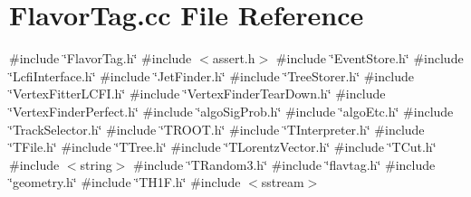 \section{Flavor\+Tag.\+cc File Reference}
\label{FlavorTag_8cc}
{\ttfamily \#include \char`\"{}Flavor\+Tag.\+h\char`\"{}}\newline
{\ttfamily \#include $<$assert.\+h$>$}\newline
{\ttfamily \#include \char`\"{}Event\+Store.\+h\char`\"{}}\newline
{\ttfamily \#include \char`\"{}Lcfi\+Interface.\+h\char`\"{}}\newline
{\ttfamily \#include \char`\"{}Jet\+Finder.\+h\char`\"{}}\newline
{\ttfamily \#include \char`\"{}Tree\+Storer.\+h\char`\"{}}\newline
{\ttfamily \#include \char`\"{}Vertex\+Fitter\+L\+C\+F\+I.\+h\char`\"{}}\newline
{\ttfamily \#include \char`\"{}Vertex\+Finder\+Tear\+Down.\+h\char`\"{}}\newline
{\ttfamily \#include \char`\"{}Vertex\+Finder\+Perfect.\+h\char`\"{}}\newline
{\ttfamily \#include \char`\"{}algo\+Sig\+Prob.\+h\char`\"{}}\newline
{\ttfamily \#include \char`\"{}algo\+Etc.\+h\char`\"{}}\newline
{\ttfamily \#include \char`\"{}Track\+Selector.\+h\char`\"{}}\newline
{\ttfamily \#include \char`\"{}T\+R\+O\+O\+T.\+h\char`\"{}}\newline
{\ttfamily \#include \char`\"{}T\+Interpreter.\+h\char`\"{}}\newline
{\ttfamily \#include \char`\"{}T\+File.\+h\char`\"{}}\newline
{\ttfamily \#include \char`\"{}T\+Tree.\+h\char`\"{}}\newline
{\ttfamily \#include \char`\"{}T\+Lorentz\+Vector.\+h\char`\"{}}\newline
{\ttfamily \#include \char`\"{}T\+Cut.\+h\char`\"{}}\newline
{\ttfamily \#include $<$string$>$}\newline
{\ttfamily \#include \char`\"{}T\+Random3.\+h\char`\"{}}\newline
{\ttfamily \#include \char`\"{}flavtag.\+h\char`\"{}}\newline
{\ttfamily \#include \char`\"{}geometry.\+h\char`\"{}}\newline
{\ttfamily \#include \char`\"{}T\+H1\+F.\+h\char`\"{}}\newline
{\ttfamily \#include $<$sstream$>$}\newline
